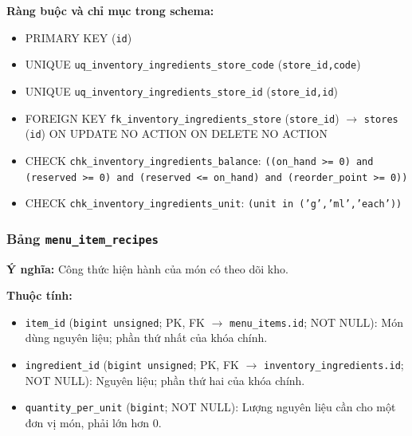 \textbf{Ràng buộc và chỉ mục trong schema:}

\begin{itemize}

\item PRIMARY KEY (\texttt{id})

\item UNIQUE \texttt{uq\_inventory\_ingredients\_store\_code} (\texttt{store\_id,code})

\item UNIQUE \texttt{uq\_inventory\_ingredients\_store\_id} (\texttt{store\_id,id})

\item FOREIGN KEY \texttt{fk\_inventory\_ingredients\_store} (\texttt{store\_id}) $\rightarrow$ \texttt{stores} (\texttt{id}) ON UPDATE NO ACTION ON DELETE NO ACTION

\item CHECK \texttt{chk\_inventory\_ingredients\_balance}: \texttt{((on\_hand >= 0) and (reserved >= 0) and (reserved <= on\_hand) and (reorder\_point >= 0))}

\item CHECK \texttt{chk\_inventory\_ingredients\_unit}: \texttt{(unit in ('g','ml','each'))}

\end{itemize}

\subsubsection{Bảng \texttt{menu\_item\_recipes}}

\textbf{Ý nghĩa:} Công thức hiện hành của món có theo dõi kho.\par

\textbf{Thuộc tính:}

\begin{itemize}

\item \texttt{item\_id} (\texttt{bigint unsigned}; PK, FK $\rightarrow$ \texttt{menu\_items.id}; NOT NULL): Món dùng nguyên liệu; phần thứ nhất của khóa chính.

\item \texttt{ingredient\_id} (\texttt{bigint unsigned}; PK, FK $\rightarrow$ \texttt{inventory\_ingredients.id}; NOT NULL): Nguyên liệu; phần thứ hai của khóa chính.

\item \texttt{quantity\_per\_unit} (\texttt{bigint}; NOT NULL): Lượng nguyên liệu cần cho một đơn vị món, phải lớn hơn 0.

\end{itemize}

